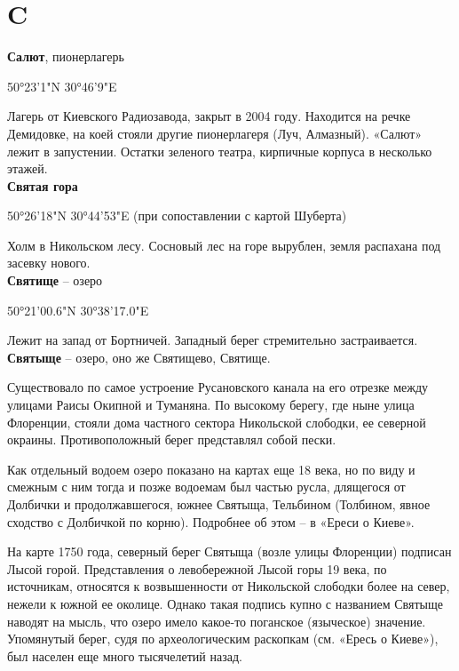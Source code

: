 \chapter*{C}

\textbf{Салют}, пионерлагерь

50°23'1"N 30°46'9"E

Лагерь от Киевского Радиозавода, закрыт в 2004 году. Находится на речке Демидовке, на коей стояли другие пионерлагеря (Луч, Алмазный). «Салют» лежит в запустении. Остатки зеленого театра, кирпичные корпуса в несколько этажей.\\


\textbf{Святая гора}

50°26'18"N 30°44'53"E (при сопоставлении с картой Шуберта)

Холм в Никольском лесу. Сосновый лес на горе вырублен, земля распахана под засевку нового.\\

\textbf{Святище} – озеро 

50°21'00.6"N 30°38'17.0"E

Лежит на запад от Бортничей. Западный берег стремительно застраивается.\\

\textbf{Святыще} – озеро, оно же Святищево, Святище. 

Существовало по самое устроение Русановского канала на его отрезке между улицами Раисы Окипной и Туманяна. По высокому берегу, где ныне улица Флоренции, стояли дома частного сектора Никольской слободки, ее северной окраины. Противоположный берег представлял собой пески.

Как отдельный водоем озеро показано на картах еще 18 века, но по виду и смежным с ним тогда и позже водоемам был частью русла, длящегося от Долбички и продолжавшегося, южнее Святыща, Тельбином (Толбином, явное сходство с Долбичкой по корню). Подробнее об этом – в «Ереси о Киеве».

На карте 1750 года, северный берег Святыща (возле улицы Флоренции) подписан Лысой горой. Представления о левобережной Лысой горы 19 века, по источникам, относятся к возвышенности от Никольской слободки более на север, нежели к южной ее околице. Однако такая подпись купно с названием Святыще наводят на мысль, что озеро имело какое-то поганское (языческое) значение. Упомянутый берег, судя по археологическим раскопкам (см. «Ересь о Киеве»), был населен еще много тысячелетий назад.

